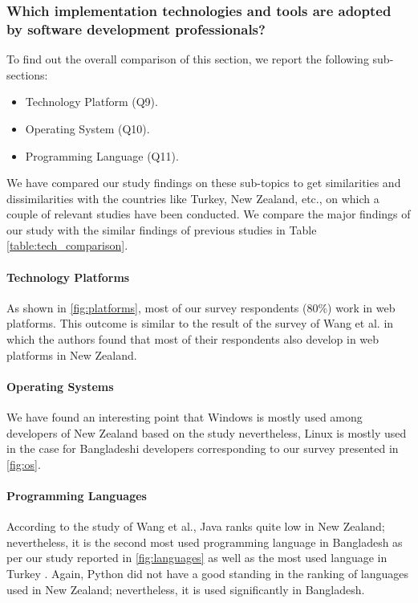 \subsubsection{Which implementation technologies and tools are adopted by software development professionals?}

To find out the overall comparison of this section, we report the following sub-sections:
\begin{itemize}
\item Technology Platform (Q9).
\item Operating System (Q10).
\item Programming Language (Q11).
\end{itemize}

We have compared our study findings on these sub-topics to get similarities and dissimilarities with the countries like Turkey, New Zealand, etc., on which a couple of relevant studies have been conducted. We compare the major findings of our study with the similar findings of previous studies in Table \ref{table:tech_comparison}.



\paragraph{Technology Platforms}
As shown in \ref{fig:platforms}, most of our survey respondents (80\%) work in web platforms. This outcome is similar to the result of the survey of Wang et al. \cite{Wang2018} in which the authors found that most of their respondents also develop in web platforms in New Zealand.


\paragraph{Operating Systems}
We have found an interesting point that Windows is mostly used among developers of New Zealand based on the study \cite{Wang2018} nevertheless, Linux is mostly used in the case for Bangladeshi developers corresponding to our survey presented in \ref{fig:os}.


\paragraph{Programming Languages}
According to the study of Wang et al.\cite{Wang2018}, Java ranks quite low in New Zealand; nevertheless, it is the second most used programming language in Bangladesh as per our study reported in \ref{fig:languages} as well as the most used language in Turkey \cite{Garousi2015}. Again, Python did not have a good standing in the ranking of languages used in New Zealand; nevertheless, it is used significantly in Bangladesh.